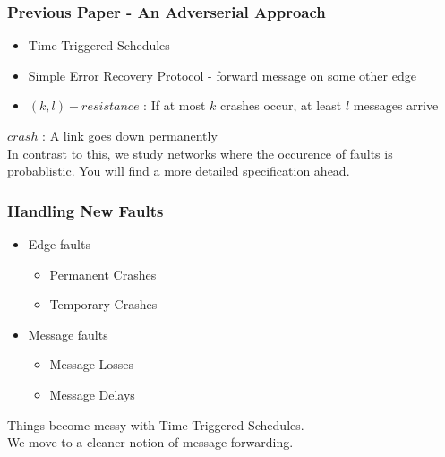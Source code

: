 \documentclass{beamer}
\begin{document}
\begin{frame}
\frametitle{Previous Paper - An Adverserial Approach}
	\begin{itemize}
	\item Time-Triggered Schedules
	\item Simple Error Recovery Protocol - forward message on some other edge
	\item $(k,l)-resistance$ : If at most $k$ crashes occur, at least $l$ messages arrive\\[3ex]
	\end{itemize}
	\hspace*{20pt}$ crash $ : A link goes down permanently\\[3ex]
	\color{blue}
	In contrast to this, we study networks where the occurence of faults is probablistic. You will find a more detailed specification ahead.
\end{frame}

\begin{frame}
\frametitle{Handling New Faults}
	\begin{itemize}
	\item Edge faults
	\begin{itemize}
		\item Permanent Crashes 
		\item Temporary Crashes
	\end{itemize}
	\item Message faults
	\begin{itemize}
		\item Message Losses
		\item Message Delays\\[2ex]
	\end{itemize}
	\end{itemize}
	\pause
	\begin{center}
	\color{red}
	Things become messy with Time-Triggered Schedules.\\We move to a cleaner notion of message forwarding.
	\end{center}
\end{frame}





\end{document}
